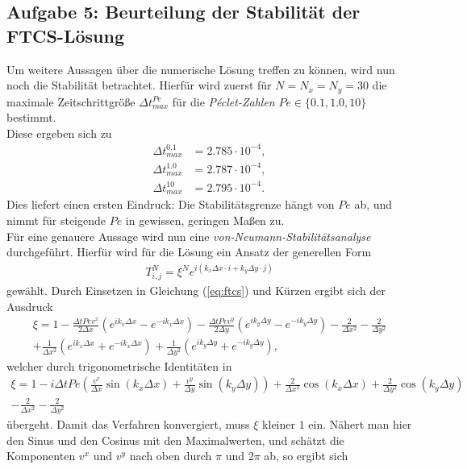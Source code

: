\documentclass[12pt,a4paper,titlepage,headinclude,bibtotoc]{scrartcl}
\begin{document}
\subsection{Aufgabe 5: Beurteilung der Stabilität der FTCS-Lösung}
\label{sec:task5}
Um weitere Aussagen über die numerische Lösung treffen zu können, wird nun noch die Stabilität betrachtet. Hierfür wird zuerst für $N=N_x=N_y = 30$ die maximale Zeitschrittgröße $\Delta t^{Pe}_{max}$ für die \textit{Péclet-Zahlen} $Pe \in \{0.1, 1.0, 10\}$ bestimmt.\\
Diese ergeben sich zu
\begin{align*}
\Delta t^{0.1}_{max} &= 2.785 \cdot 10^{-4}, \\
\Delta t^{1.0}_{max} &= 2.787 \cdot 10^{-4}, \\
\Delta t^{10}_{max}  &= 2.795 \cdot 10^{-4}.
\end{align*}
Dies liefert einen ersten Eindruck: Die Stabilitätsgrenze hängt von $Pe$ ab, und nimmt für steigende $Pe$ in gewissen, geringen Maßen zu.\\
Für eine genauere Aussage wird nun eine \textit{von-Neumann-Stabilitätsanalyse} durchgeführt. Hierfür wird für die Lösung ein Ansatz der generellen Form
\begin{align*}
T^N_{i,j} = \xi^N e^{i(k_x \Delta x \cdot i + k_y \Delta y \cdot j)}
\end{align*}
gewählt.
Durch Einsetzen in Gleichung (\ref{eq:ftcs}) und Kürzen ergibt sich der Ausdruck
\begin{align*}
\xi = 1 - \frac{\Delta t Pe v^x}{2 \Delta x} \left( e^{i k_x \Delta x} - e^{-i k_x \Delta x} \right) - \frac{\Delta t Pe v^y}{2 \Delta y} \left( e^{i k_y \Delta y} - e^{-i k_y \Delta y} \right) -\frac{2}{\Delta x^2} - \frac{2}{\Delta y^2} \\
 + \frac{1}{\Delta x^2} \left( e^{i k_x \Delta x} + e^{-i k_x \Delta x} \right) +\frac{1}{\Delta y^2} \left( e^{i k_y \Delta y} + e^{-i k_y \Delta y} \right),
\end{align*}
welcher durch trigonometrische Identitäten in
\begin{align*}
\xi = 1 - i \Delta t Pe\left(\frac{ v^x }{\Delta x} \sin(k_x \Delta x) + \frac{v^y}{\Delta y}  \sin(k_y \Delta y) \right) + \frac{2}{\Delta x^2}\cos(k_x \Delta x) + \frac{2}{\Delta y^2}\cos(k_y \Delta y) \\-\frac{2}{\Delta x^2} - \frac{2}{\Delta y^2}
\end{align*}
übergeht. Damit das Verfahren konvergiert, muss $\xi$ kleiner $1$ ein. Nähert man hier den Sinus und den Cosinus mit den Maximalwerten, und schätzt die Komponenten $v^x$ und $v^y$ nach oben durch $\pi$ und $2\pi$ ab, so ergibt sich
\end{document}
